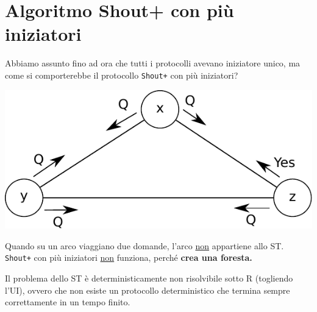 \section{Algoritmo Shout+ con più iniziatori}
Abbiamo assunto fino ad ora che tutti i protocolli avevano iniziatore unico, ma
come si comporterebbe il protocollo \texttt{Shout+} con più iniziatori?
\begin{center}
    \includegraphics[scale=0.8]{capitoli/costruzione-spanning-tree/imgs/n_36}
\end{center}
Quando su un arco viaggiano due domande, l'arco \underline{non} appartiene allo
ST. \\
\texttt{Shout+} con più iniziatori \underline{non} funziona, perché \textbf{crea
    una foresta.}

\begin{theorem}
    Il problema dello ST è deterministicamente non risolvibile sotto R
    (togliendo l'UI), ovvero che non esiste un protocollo deterministico che
    termina sempre correttamente in un tempo finito.
\end{theorem}

